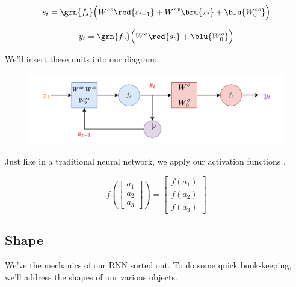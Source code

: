         \begin{equation}
            s_t = \grn{f_s} \Big( W^{ss}\red{s_{t-1}} + W^{sx}\bru{x_t} + \blu{W^{ss}_0} \Big)
        \end{equation}

        \begin{equation}
            y_t = \grn{f_o} \Big( W^o\red{s_t} + \blu{W^o_0} \Big)
        \end{equation}

        We'll insert these units into our diagram:

        \begin{figure}[H]
            \centering
            \includegraphics[width=150mm,scale=0.4]{images/rnn_images/rnn_flat.png}
        \end{figure}

        \begin{concept}
            Just like in a traditional neural network, we apply our activation functions .

            \begin{equation*}
                f \left( 
                \begin{bmatrix}
                    a_1 \\ a_2 \\ a_3
                \end{bmatrix}
                \right) 
                =
                \begin{bmatrix}
                    f(a_1) \\ f(a_2) \\ f(a_3)
                \end{bmatrix}
            \end{equation*}
        \end{concept}

    \subsection{Shape}

        We've the mechanics of our RNN sorted out. To do some quick book-keeping, we'll address the shapes of our various objects.

